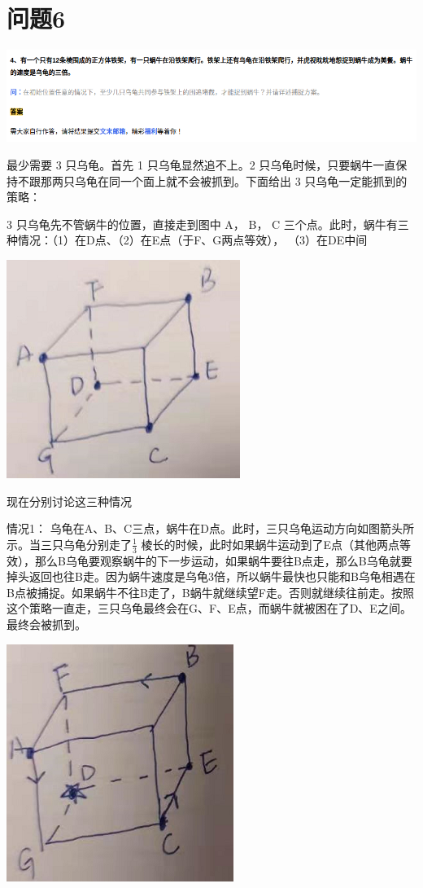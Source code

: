 \documentclass{article}
\begin{document}
\newpage
\section{问题6}
\includegraphics[scale=0.5]{turtle.png}

最少需要 3 只乌龟。首先 1 只乌龟显然追不上。2 只乌龟时候，只要蜗牛一直保持不跟那两只乌龟在同一个面上就不会被抓到。下面给出 3 只乌龟一定能抓到的策略：

3 只乌龟先不管蜗牛的位置，直接走到图中 A， B， C 三个点。此时，蜗牛有三种情况：（1）在D点、（2）在E点（于F、G两点等效）， （3）在DE中间

\includegraphics[scale=0.5]{cube01.png}

\vspace{60pt}

现在分别讨论这三种情况

情况1： 乌龟在A、B、C三点，蜗牛在D点。此时，三只乌龟运动方向如图箭头所示。当三只乌龟分别走了$\frac{1}{3}$ 棱长的时候，此时如果蜗牛运动到了E点（其他两点等效），那么B乌龟要观察蜗牛的下一步运动，如果蜗牛要往B点走，那么B乌龟就要掉头返回也往B走。因为蜗牛速度是乌龟3倍，所以蜗牛最快也只能和B乌龟相遇在B点被捕捉。如果蜗牛不往B走了，B蜗牛就继续望F走。否则就继续往前走。按照这个策略一直走，三只乌龟最终会在G、F、E点，而蜗牛就被困在了D、E之间。最终会被抓到。

\includegraphics[scale=0.5]{cube02.png}
\end{document}
